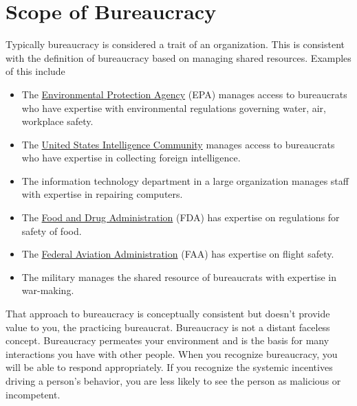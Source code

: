 \section{Scope of Bureaucracy}
Typically bureaucracy is considered a trait of an organization. This is consistent with the definition of bureaucracy based on managing shared resources. Examples of this include
  \begin{itemize}
      \item The \href{https://www.epa.gov/}{Environmental Protection Agency} (EPA) manages access to bureaucrats who have expertise with environmental regulations governing water, air, workplace safety.
      \item The \href{https://www.intelligence.gov/}{United States Intelligence Community} manages access to bureaucrats who have expertise in collecting foreign intelligence.
      \item The information technology department in a large organization manages staff with expertise in repairing computers.
      \item The \href{https://www.fda.gov/}{Food and Drug Administration} (FDA) has expertise on regulations for safety of food.
      \item The \href{https://www.faa.gov/}{Federal Aviation Administration} (FAA) has expertise on flight safety.
      \item The military manages the shared resource of bureaucrats with expertise in war-making.
  \end{itemize}

That approach to bureaucracy is conceptually consistent but doesn't provide value to you, the practicing bureaucrat. Bureaucracy is not a distant faceless concept. Bureaucracy permeates your environment and is the basis for many interactions you have with other people. 
  When you recognize bureaucracy, you will be able to respond appropriately. If you recognize the systemic incentives driving a person's behavior, you are less likely to see the person as malicious or incompetent. 